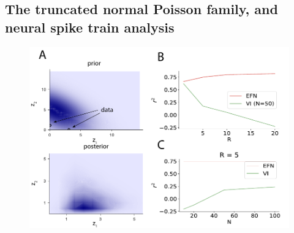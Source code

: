 \documentclass[twoside]{article}
\begin{document}
\subsection{The truncated normal Poisson family, and neural spike train analysis}

\begin{figure}
\centering
\includegraphics[scale=0.38]{figs/fig5/fig5.pdf}
\label{fig:test2}
\end{figure}
\end{document}
